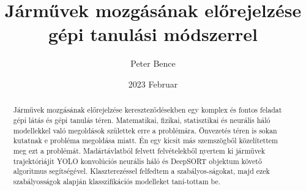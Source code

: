 \documentclass{article}
\title{Járművek mozgásának előrejelzése gépi tanulási módszerrel}
\author{Peter Bence}
\date{2023 Februar}
\begin{document}
    
    \maketitle
    \begin{abstract}
        Járművek mozgásának előrejelzése kereszteződésekben egy komplex és fontos feladat gépi látás 
        és gépi tanulás téren. Matematikai, fizikai, statisztikai és neurális háló modellekkel való 
        megoldások születtek erre a problémára.\cite{1238912}\cite{6696982}\cite{8186191}\cite{8317943} 
        Önvezetés téren is sokan kutatnak e probléma megoldása miatt. 
        Én egy kicsit más szemszögből közelítettem meg ezt a problémát. Madártávlatból felvett felvételekből
        nyertem ki járművek trajektóriájit YOLO konvolúciós neurális háló\cite{wang2022yolov7} és 
        DeepSORT\cite{Wojke2018deep}\cite{Wojke2017simple} objektum követő algoritmus segítségével.
        Klaszterezéssel felfedtem a szabályos-ságokat, majd ezek szabályosságok alapján klasszifikációs
        modelleket taní-tottam be.
    \end{abstract}
    \tableofcontents
    
\end{document}
